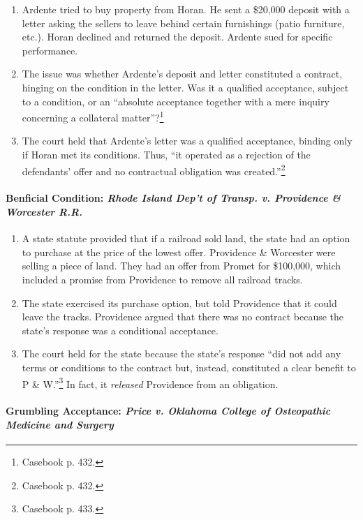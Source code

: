 \begin{enumerate}
    \item Ardente tried to buy property from Horan. He sent a \$20,000 deposit 
    with a letter asking the sellers to leave behind certain furnishings 
    (patio furniture, etc.). Horan declined and returned the deposit. Ardente 
    sued for specific performance.
    \item The issue was whether Ardente's deposit and letter constituted a 
    contract, hinging on the condition in the letter. Was it a qualified 
    acceptance, subject to a condition, or an ``absolute acceptance together 
    with a mere inquiry concerning a collateral matter''?\footnote{Casebook 
    p. 432.}
    \item The court held that Ardente's letter was a qualified acceptance, 
    binding only if Horan met its conditions. Thus, ``it operated as a 
    rejection of the defendants' offer and no contractual obligation was 
    created.''\footnote{Casebook p. 432.}
\end{enumerate}

\paragraph{Benficial Condition: \emph{Rhode Island Dep't of Transp. v. 
Providence \& Worcester R.R.}}

\begin{enumerate}
    \item A state statute provided that if a railroad sold land, the state had 
    an option to purchase at the price of the lowest offer. Providence \& 
    Worcester were selling a piece of land. They had an offer from Promet for 
    \$100,000, which included a promise from Providence to remove all railroad 
    tracks.
    \item The state exercised its purchase option, but told Providence that it 
    could leave the tracks. Providence argued that there was no contract 
    because the state's response was a conditional acceptance.
    \item The court held for the state because the state's response ``did not 
    add any terms or conditions to the contract but, instead, constituted 
    a clear benefit to P \& W.''\footnote{Casebook p. 433.} In fact, it 
    \emph{released} Providence from an obligation.
\end{enumerate}

\paragraph{Grumbling Acceptance: \emph{Price v. Oklahoma College of 
Osteopathic Medicine and Surgery}}

